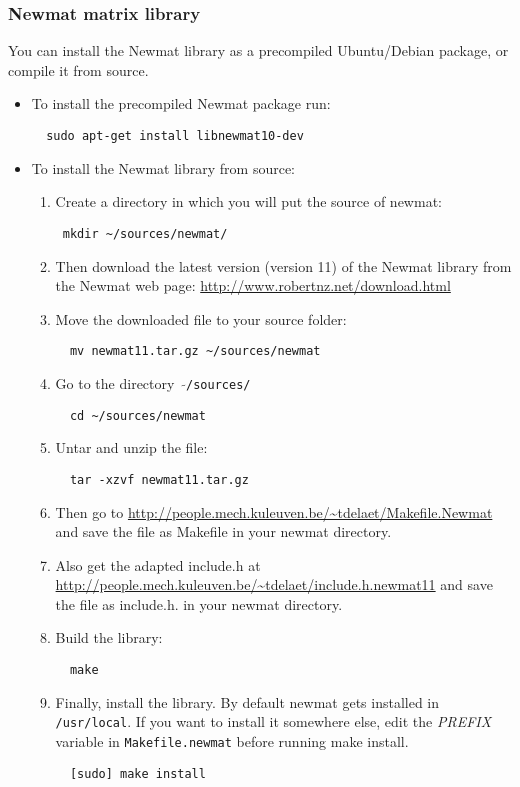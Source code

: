 \documentclass[a4paper,10pt]{article}
\begin{document}
\subsubsection{Newmat matrix library}
You can install the Newmat library as a precompiled Ubuntu/Debian
package, or compile it from source.
\begin{itemize}
\item To install the precompiled Newmat package run:
\begin{verbatim}
  sudo apt-get install libnewmat10-dev
\end{verbatim}


\item To install the Newmat library from source:
\begin{enumerate}
\item Create a directory in which you will put the source of newmat:
\begin{verbatim}
 mkdir ~/sources/newmat/
\end{verbatim}
\item Then download the latest version (version 11) of the Newmat library from the
  Newmat web page:
  \url{http://www.robertnz.net/download.html}
\item Move the downloaded file to your source folder:
\begin{verbatim}
  mv newmat11.tar.gz ~/sources/newmat
\end{verbatim}
\item Go to the directory \ $\mathtt{\tilde{ }}$\texttt{/sources/}
\begin{verbatim}
  cd ~/sources/newmat
\end{verbatim}
\item Untar and unzip the file:
\begin{verbatim}
  tar -xzvf newmat11.tar.gz
\end{verbatim}
\item Then go to \url{http://people.mech.kuleuven.be/~tdelaet/Makefile.Newmat} and save the file as Makefile in your newmat directory.
\item Also get the adapted include.h at \url{http://people.mech.kuleuven.be/~tdelaet/include.h.newmat11} and save the file as include.h. in your newmat directory.
\item Build the library:
\begin{verbatim}
  make 
\end{verbatim}
\item Finally, install the library.  By default newmat gets installed
  in \texttt{/usr/local}.  If you want to install it somewhere else,
  edit the \emph{PREFIX} variable in \texttt{Makefile.newmat} before
  running make install.
\begin{verbatim}
  [sudo] make install
\end{verbatim}
\end{enumerate}
\end{itemize}
\end{document}
